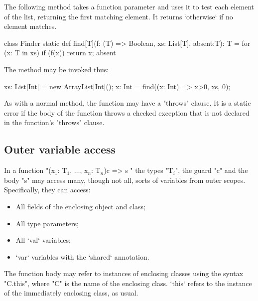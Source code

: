 \begin{example}
The following method takes a function parameter and uses it to
test each element of the list, returning the first matching
element.  It returns \xcd`otherwise` if no element matches.

\begin{xten}
class Finder {
static def find[T](f: (T) => Boolean, xs: List[T], absent:T): T = {
  for (x: T in xs)
    if (f(x)) return x;
  absent
  }}
\end{xten}

The method may be invoked thus:
\begin{xten}
xs: List[Int] = new ArrayList[Int]();
x: Int = find((x: Int) => x>0, xs, 0);
\end{xten}

\end{example}

As with a normal method, the function may have a \xcd"throws"
clause. It is a static error if the body of the function throws a
checked exception that is not declared in the function's \xcd"throws"
clause.

\subsection{Outer variable access}

In a function
\xcdmath"(x$_1$: T$_1$, $\dots$, x$_n$: T$_n$){c} => { s }"
the types \xcdmath"T$_i$", the guard \xcd"c" and the body \xcd"s"
may access many, though not all, sorts of variables from outer scopes.  
Specifically, they can access: 
\begin{itemize}
\item All fields of the enclosing object and class;
\item All type parameters;
\item All \xcd`val` variables;
\item \xcd`var` variables with the \xcd`shared` annotation. 
\end{itemize}



The function body may refer to instances of enclosing classes using
the syntax \xcd"C.this", where \xcd"C" is the name of the
enclosing class.  \xcd`this` refers to the instance of the immediately
enclosing class, as usual.

